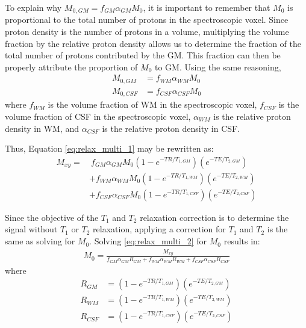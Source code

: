 \documentclass{article}
\begin{document}
To explain why $M_{0,GM} = f_{GM} \alpha_{GM} M_0$, it is important to remember that $M_0$ is proportional to the total number of protons in the spectroscopic voxel. Since proton density is the number of protons in a volume, multiplying the volume fraction by the relative proton density allows us to determine the fraction of the total number of protons contributed by the GM. This fraction can then be properly attribute the proportion of $M_0$ to GM. Using the same reasoning,
\begin{align*}
	M_{0,GM} &= f_{WM} \alpha_{WM} M_0 \\
	M_{0,CSF} &= f_{CSF} \alpha_{CSF} M_0
\end{align*}
where $f_{WM}$ is the volume fraction of WM in the spectroscopic voxel, $f_{CSF}$ is the volume fraction of CSF in the spectroscopic voxel, $\alpha_{WM}$ is the relative proton density in WM, and $\alpha_{CSF}$ is the relative proton density in CSF.

Thus, Equation \eqref{eq:relax_multi_1} may be rewritten as:
\begin{align}
	\label{eq:relax_multi_2}	
	M_{xy} =	 & ~ f_{GM} \alpha_{GM} M_0 \left(1-e^{-TR/T_{1, GM}}\right)\left(e^{-TE/T_{2, GM}}\right) \nonumber \\
			 & + f_{WM} \alpha_{WM} M_0 \left(1-e^{-TR/T_{1, WM}}\right)\left(e^{-TE/T_{2, WM}}\right) \\
			 & + f_{CSF} \alpha_{CSF} M_0 \left(1-e^{-TR/T_{1, CSF}}\right)\left(e^{-TE/T_{2, CSF}}\right) \nonumber
\end{align}

Since the objective of the $T_1$ and $T_2$ relaxation correction is to determine the signal without $T_1$ or $T_2$ relaxation, applying a correction for $T_1$ and $T_2$ is the same as solving for $M_0$. Solving \eqref{eq:relax_multi_2} for $M_0$ results in:
\begin{align}
	M_0 = \frac{M_{xy}}{f_{GM} \alpha_{GM} R_{GM} + f_{WM} \alpha_{WM} R_{WM} + f_{CSF} \alpha_{CSF}  R_{CSF}}
	\label{eq:relax_corr}
\end{align}
where
\begin{align*}
	R_{GM} &= \left(1-e^{-TR/T_{1, GM}}\right)\left(e^{-TE/T_{2, GM}}\right) \\
	R_{WM} &= \left(1-e^{-TR/T_{1, WM}}\right)\left(e^{-TE/T_{2, WM}}\right) \\
	R_{CSF} &= \left(1-e^{-TR/T_{1, CSF}}\right)\left(e^{-TE/T_{2, CSF}}\right) \\
\end{align*}
\end{document}
